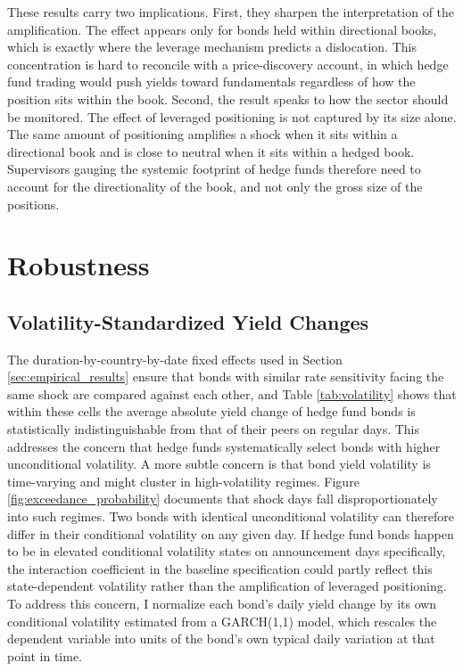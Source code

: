 \documentclass[english, 11pt, oneside]{article}
\begin{document}
These results carry two implications. First, they sharpen the interpretation of the amplification. The effect appears only for bonds held within directional books, which is exactly where the leverage mechanism predicts a dislocation. This concentration is hard to reconcile with a price-discovery account, in which hedge fund trading would push yields toward fundamentals regardless of how the position sits within the book. Second, the result speaks to how the sector should be monitored. The effect of leveraged positioning is not captured by its size alone. The same amount of positioning amplifies a shock when it sits within a directional book and is close to neutral when it sits within a hedged book. Supervisors gauging the systemic footprint of hedge funds therefore need to account for the directionality of the book, and not only the gross size of the positions.


\section{Robustness}
\label{sec:robustness_main}
\subsection{Volatility-Standardized Yield Changes}
\label{subsec:GARCH}

The duration-by-country-by-date fixed effects used in Section \ref{sec:empirical_results} ensure that bonds with similar rate sensitivity facing the same shock are compared against each other, and Table \ref{tab:volatility} shows that within these cells the average absolute yield change of hedge fund bonds is statistically indistinguishable from that of their peers on regular days. This addresses the concern that hedge funds systematically select bonds with higher unconditional volatility. A more subtle concern is that bond yield volatility is time-varying and might cluster in high-volatility regimes. Figure \ref{fig:exceedance_probability} documents that shock days fall disproportionately into such regimes. Two bonds with identical unconditional volatility can therefore differ in their conditional volatility on any given day. If hedge fund bonds happen to be in elevated conditional volatility states on announcement days specifically, the interaction coefficient in the baseline specification could partly reflect this state-dependent volatility rather than the amplification of leveraged positioning. To address this concern, I normalize each bond's daily yield change by its own conditional volatility estimated from a GARCH(1,1) model, which rescales the dependent variable into units of the bond's own typical daily variation at that point in time.
\end{document}
